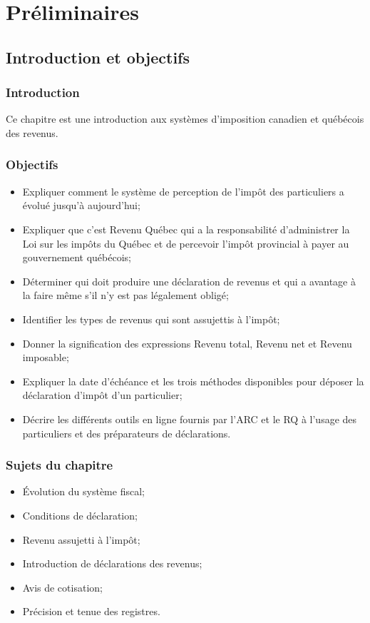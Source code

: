 \chapter{Préliminaires}



\section{Introduction et objectifs}
\subsection{Introduction}
Ce chapitre est une introduction aux systèmes d'imposition canadien et québécois des revenus.


\subsection{Objectifs}
\begin{itemize}[label=]
	\item Expliquer comment le système de perception de l'impôt des particuliers a évolué jusqu'à aujourd'hui;
	\item Expliquer que c'est Revenu Québec qui a la responsabilité d'administrer la Loi sur les impôts du Québec et de percevoir l'impôt provincial à payer au gouvernement québécois;
	\item Déterminer qui doit produire une déclaration de revenus et qui a avantage à la faire même s'il n'y est pas légalement obligé;
	\item Identifier les types de revenus qui sont assujettis à l'impôt;
	\item Donner la signification des expressions \og Revenu total\fg{}, \og Revenu net\fg{} et \og Revenu imposable\fg{};
	\item Expliquer la date d'échéance et les trois méthodes disponibles pour déposer la déclaration d'impôt d'un particulier;
	\item Décrire les différents outils en ligne fournis par l'ARC et le RQ à l'usage des particuliers et des préparateurs de déclarations.
\end{itemize}


\subsection{Sujets du chapitre}
\begin{itemize}
	\item Évolution du système fiscal;
	\item Conditions de déclaration;
	\item Revenu assujetti à l'impôt;
	\item Introduction de déclarations des revenus;
	\item Avis de cotisation;
	\item Précision et tenue des registres.
\end{itemize}



